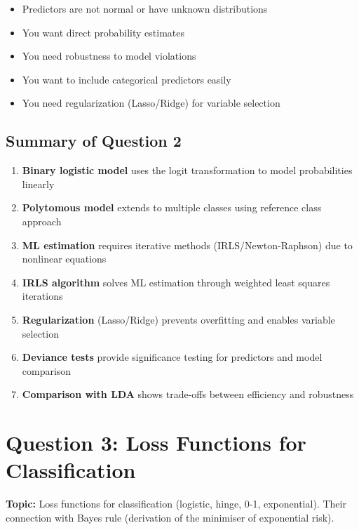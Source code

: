 \documentclass[12pt,a4paper]{article}
\begin{document}
\begin{tcolorbox}[colback=blue!5!white,colframe=blue!75!black,title=Use Logistic Regression when:]
\begin{itemize}
    \item Predictors are not normal or have unknown distributions
    \item You want direct probability estimates
    \item You need robustness to model violations
    \item You want to include categorical predictors easily
    \item You need regularization (Lasso/Ridge) for variable selection
\end{itemize}
\end{tcolorbox}

\subsection{Summary of Question 2}

\begin{enumerate}
    \item \textbf{Binary logistic model} uses the logit transformation to model probabilities linearly
    \item \textbf{Polytomous model} extends to multiple classes using reference class approach
    \item \textbf{ML estimation} requires iterative methods (IRLS/Newton-Raphson) due to nonlinear equations
    \item \textbf{IRLS algorithm} solves ML estimation through weighted least squares iterations
    \item \textbf{Regularization} (Lasso/Ridge) prevents overfitting and enables variable selection
    \item \textbf{Deviance tests} provide significance testing for predictors and model comparison
    \item \textbf{Comparison with LDA} shows trade-offs between efficiency and robustness
\end{enumerate}

\newpage
\section{Question 3: Loss Functions for Classification}

\textbf{Topic:} Loss functions for classification (logistic, hinge, 0-1, exponential). Their connection with Bayes rule (derivation of the minimiser of exponential risk).
\end{document}
